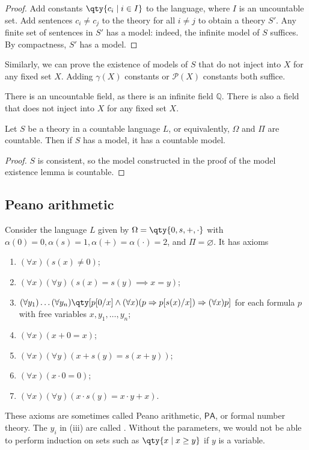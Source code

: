 \begin{proof}
    Add constants $\qty{c_i \mid i \in I}$ to the language, where $I$ is an uncountable set.
    Add sentences $c_i \neq c_j$ to the theory for all $i \neq j$ to obtain a theory $S'$.
    Any finite set of sentences in $S'$ has a model: indeed, the infinite model of $S$ suffices.
    By compactness, $S'$ has a model.
\end{proof}
\begin{remark}
    Similarly, we can prove the existence of models of $S$ that do not inject into $X$ for any fixed set $X$.
    Adding $\gamma(X)$ constants or $\mathcal P(X)$ constants both suffice.
\end{remark}
\begin{example}
    There is an uncountable field, as there is an infinite field $\mathbb Q$.
    There is also a field that does not inject into $X$ for any fixed set $X$.
\end{example}
\begin{theorem}
    Let $S$ be a theory in a countable language $L$, or equivalently, $\Omega$ and $\Pi$ are countable.
    Then if $S$ has a model, it has a countable model.
\end{theorem}
\begin{proof}
    $S$ is consistent, so the model constructed in the proof of the model existence lemma is countable.
\end{proof}

\subsection{Peano arithmetic}
Consider the language $L$ given by $\Omega = \qty{0, s, +, \cdot}$ with $\alpha(0) = 0, \alpha(s) = 1, \alpha(+) = \alpha(\cdot) = 2$, and $\Pi = \varnothing$.
It has axioms
\begin{enumerate}
    \item $(\forall x)(s(x) \neq 0)$;
    \item $(\forall x)(\forall y)(s(x) = s(y) \implies x = y)$;
    \item $(\forall y_1)\dots(\forall y_n)\qty[p[0/x] \wedge (\forall x)(p \implies p[s(x)/x]) \implies (\forall x)p]$ for each formula $p$ with free variables $x, y_1, \dots, y_n$;
    \item $(\forall x)(x + 0 = x)$;
    \item $(\forall x)(\forall y)(x + s(y) = s(x + y))$;
    \item $(\forall x)(x \cdot 0 = 0)$;
    \item $(\forall x)(\forall y)(x \cdot s(y) = x \cdot y + x)$.
\end{enumerate}
These axioms are sometimes called Peano arithmetic, $\mathsf{PA}$, or formal number theory.
The $y_i$ in (iii) are called .
Without the parameters, we would not be able to perform induction on sets such as $\qty{x \mid x \geq y}$ if $y$ is a variable.

